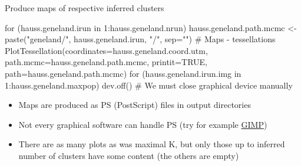 \documentclass[compress, xelatex, 11pt, xcolor=svgnames, aspectratio=169,
	hyperref={
		bookmarks=true,
		unicode=true,
		colorlinks=true,
		pdftitle={Molecular data in R},
		plainpages=false,
		pdfauthor={Vojtech Zeisek},
		pdfsubject={Course about phylogeny and evolution in R},
		pdfcreator={XeLaTeX},
		pdfkeywords={R, evolution, phylogeny, molecular data},
		linkcolor=Crimson, %
		anchorcolor=Magenta, %
		citecolor=Magenta, %
		filecolor=Magenta, %
		menucolor=Magenta, %
		urlcolor=DodgerBlue, %
		},
	url={hyphens, lowtilde} %
	]{beamer}
\begin{document}

\begin{frame}[fragile]{Produce maps of respective inferred clusters}
	\begin{spluscode}
    for (hauss.geneland.irun in 1:hauss.geneland.nrun) {
      hauss.geneland.path.mcmc <- paste("geneland/",
        hauss.geneland.irun, "/", sep="")
      # Maps - tessellations
      PlotTessellation(coordinates=hauss.geneland.coord.utm,
        path.mcmc=hauss.geneland.path.mcmc, printit=TRUE,
        path=hauss.geneland.path.mcmc)
      for (hauss.geneland.irun.img in 1:hauss.geneland.maxpop) {
        dev.off() } # We must close graphical device manually
      }
	\end{spluscode}
	\begin{itemize}
		\item Maps are produced as PS (PostScript) files in output directories
		\item Not every graphical software can handle PS (try for example \href{https://www.gimp.org/}{GIMP})
		\item There are as many plots as was maximal K, but only those up to inferred number of clusters have some content (the others are empty)
	\end{itemize}
\end{frame}
\end{document}
